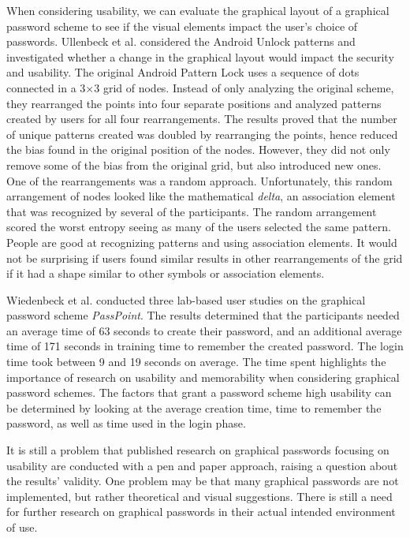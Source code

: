     When considering usability, we can evaluate the graphical layout of a graphical password scheme to see if the visual elements impact the user's choice of passwords. Ullenbeck et al. \cite{Uellenbeck} considered the Android Unlock patterns and investigated whether a change in the graphical layout would impact the security and usability. The original Android Pattern Lock uses a sequence of dots connected in a 3$\times$3 grid of nodes. Instead of only analyzing the original scheme, they rearranged the points into four separate positions and analyzed patterns created by users for all four rearrangements. The results proved that the number of unique patterns created was doubled by rearranging the points, hence reduced the bias found in the original position of the nodes. However, they did not only remove some of the bias from the original grid, but also introduced new ones. One of the rearrangements was a random approach. Unfortunately, this random arrangement of nodes looked like the mathematical {\it delta}, an association element that was recognized by several of the participants. The random arrangement scored the worst entropy seeing as many of the users selected the same pattern. People are good at recognizing patterns and using association elements. It would not be surprising if users found similar results in other rearrangements of the grid if it had a shape similar to other symbols or association elements.

    Wiedenbeck et al. \cite{Wiedenbeck1, Wiedenbeck2, Wiedenbeck3} conducted three lab-based user studies on the graphical password scheme {\it PassPoint}. The results determined that the participants needed an average time of 63 seconds to create their password, and an additional average time of 171 seconds in training time to remember the created password. The login time took between 9 and 19 seconds on average. The time spent highlights the importance of research on usability and memorability when considering graphical password schemes. The factors that grant a password scheme high usability can be determined by looking at the average creation time, time to remember the password, as well as time used in the login phase. 

    It is still a problem that published research on graphical passwords focusing on usability are conducted with a pen and paper approach, raising a question about the results’ validity. One problem may be that many graphical passwords are not implemented, but rather theoretical and visual suggestions. There is still a need for further research on graphical passwords in their actual intended environment of use.

